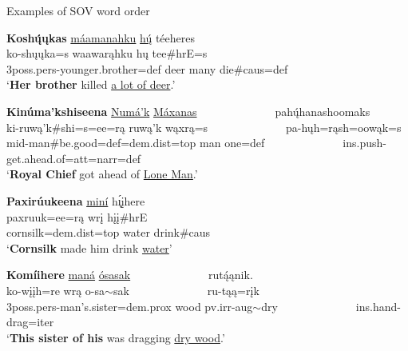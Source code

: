 \newpage

\begin{exe}
    \item\label{Ch5SOVWordOrder} Examples of SOV word order

    \begin{xlist}
        \item\label{Ch5SOVWordOrderA} \glll \textbf{Koshų́ųkas} \uline{máamanahku} \uline{hų́} téeheres\\
        ko-shųųka=s waawarąhku hų tee\#hrE=s\\
        3poss.pers-\textnormal{younger.brother}=def \textnormal{deer} \textnormal{many} \textnormal{die}\#caus=def\\
        \glt `\textbf{Her brother} killed \uline{a lot of deer}.' \citep[202]{hollow1973b}

        \item\label{Ch5SOVWordOrderB} \glll \textbf{Kinúma'kshiseena} \uline{Numá'k} \uline{Máxanas} ~ ~ ~ ~ ~ ~ ~ ~ pahų́hanashoomaks\\
        {ki-ruwą'k\#shi=s=ee=rą} {ruwą'k} {wąxrą=s} ~ ~ ~ ~ ~ ~ ~ ~ pa-hųh=rąsh=oowąk=s\\
        {mid-}\textnormal{man}{\#}\textnormal{be.good}{=def=dem.dist=top} {\textnormal{man}} {\textnormal{one}=def} ~ ~ ~ ~ ~ ~ ~ ~ ins.push-\textnormal{get.ahead.of}=att=narr=def\\
        \glt `\textbf{Royal Chief} got ahead of \uline{Lone Man}.' \citep[9]{hollow1973a}

        \item\label{Ch5SOVWordOrderC} \glll \textbf{Paxirúukeena} \uline{miní} h\'{ı̨}įhere\\
        paxruuk=ee=rą wrį hįį\#hrE\\
        \textnormal{cornsilk}=dem.dist=top \textnormal{water} \textnormal{drink}\#caus\\
        \glt `\textbf{Cornsilk} made him drink \uline{water}' \citep[133]{hollow1973a}

        \item\label{Ch5SOVWordOrderD} \glll \textbf{Komíihere} \uline{maná} \uline{ósasak} ~ ~ ~ ~ ~ ~ ~ ~ rutą́ąnik.\\
        ko-wįįh=re wrą o-sa$\sim$sak ~ ~ ~ ~ ~ ~ ~ ~ ru-tąą=rįk\\
        3poss.pers-\textnormal{man's.sister}=dem.prox \textnormal{wood} pv.irr-aug$\sim$\textnormal{dry} ~ ~ ~ ~ ~ ~ ~ ~ ins.hand-\textnormal{drag}=iter\\
        \glt `\textbf{This sister of his} was dragging \uline{dry wood}.' \citep[196]{hollow1973a}
        
    \end{xlist}
\end{exe}

